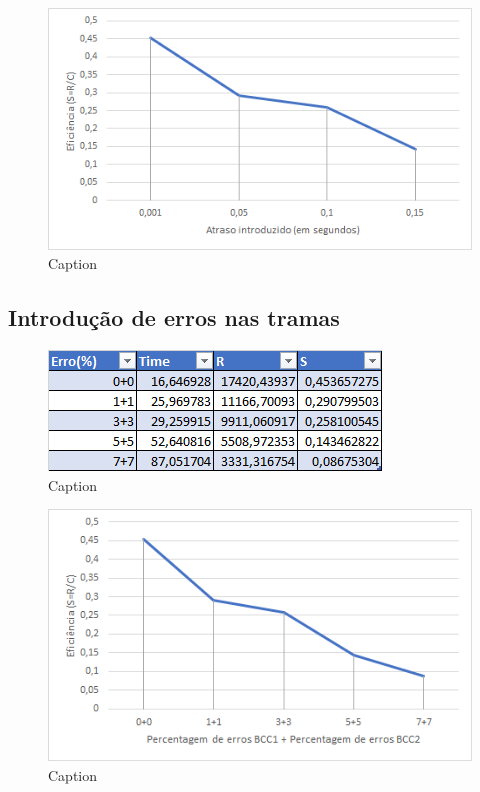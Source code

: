 \documentclass{article}
\begin{document}
\begin{figure}[h]
	\includegraphics[width=\textwidth]{atraso.png}
	\caption{Caption}
\end{figure}

\subsection{Introdução de erros nas tramas}

\begin{figure}[h]
	\includegraphics[width=\textwidth]{tabelaErro.png}
	\caption{Caption}
\end{figure}

\begin{figure}[h]
	\includegraphics[width=\textwidth]{erro.png}
	\caption{Caption}
\end{figure}





	
	
\end{document}
